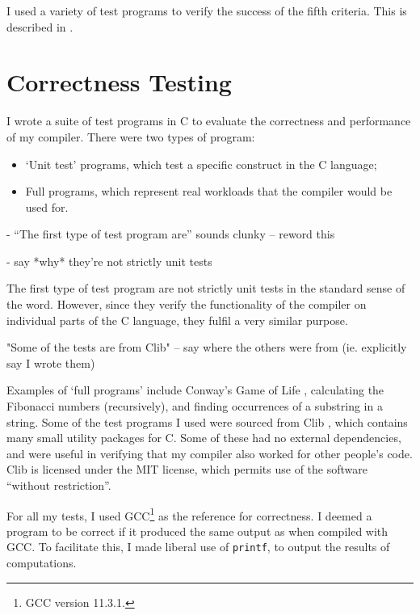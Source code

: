 \documentclass[00-main.tex]{subfiles}
\begin{document}
I used a variety of test programs to verify the success of the fifth criteria. This is described in .


\section{Correctness Testing} \label{sec:eval:testing}

I wrote a suite of test programs in C to evaluate the correctness and performance of my compiler.
There were two types of program:
\begin{itemize}
\item `Unit test' programs, which test a specific construct in the C language;
\item Full programs, which represent real workloads that the compiler would be used for.
\end{itemize}

\begin{Comment}
- ``The first type of test program are'' sounds clunky -- reword this

- say *why* they're not strictly unit tests
\end{Comment}

The first type of test program are not strictly unit tests in the standard sense of the word. However, since they verify the functionality of the compiler on individual parts of the C language, they fulfil a very similar purpose.

\begin{Comment}
"Some of the tests are from Clib" -- say where the others were from (ie. explicitly say I wrote them)
\end{Comment}

Examples of `full programs' include Conway's Game of Life \cite{conways-game-of-life}, calculating the Fibonacci numbers (recursively), and finding occurrences of a substring in a string.
Some of the test programs I used were sourced from Clib \cite{clib}, which contains many small utility packages for C. Some of these had no external dependencies, and were useful in verifying that my compiler also worked for other people's code. Clib is licensed under the MIT license, which permits use of the software ``without restriction''.

For all my tests, I used GCC\footnote{GCC version 11.3.1.} as the reference for correctness.
I deemed a program to be correct if it produced the same output as when compiled with GCC.
To facilitate this, I made liberal use of \texttt{printf}, to output the results of computations.
\end{document}
